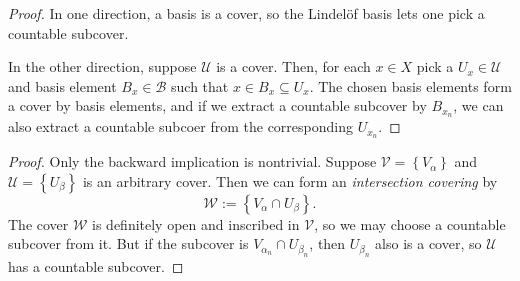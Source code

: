 
\begin{proof}
    In one direction, a basis is a cover, so the Lindel\"of basis lets one pick a countable subcover.

    In the other direction, suppose \( \mathcal{U} \) is a cover. Then, for each \( x \in X \) pick a \( U_x \in \mathcal{U} \) and basis element \( B_x \in \mathcal{B} \) such that \( x \in B_x \subseteq U_x \). The chosen basis elements form a cover by basis elements, and if we extract a countable subcover by \( B_{x_n} \), we can also extract a countable subcoer from the corresponding \( U_{x_n} \). 
\end{proof}


\begin{proof}
    Only the backward implication is nontrivial. Suppose \( \mathcal{V} = \left\{ V_\alpha \right\} \) and \( \mathcal{U} = \left\{ U_{\beta} \right\} \) is an arbitrary cover. Then we can form an \emph{intersection covering} by
    \[ 
       \mathcal{W} := \left\{ V_\alpha \cap U_\beta \right\}.
   \]
   The cover \( \mathcal{W} \) is definitely open and inscribed in \( \mathcal{V} \), so we may choose a countable subcover from it. But if the subcover is \( V_{\alpha_n} \cap U_{\beta_n} \), then \( U_{\beta_n} \) also is a cover, so \( \mathcal{U} \) has a countable subcover.
\end{proof}


